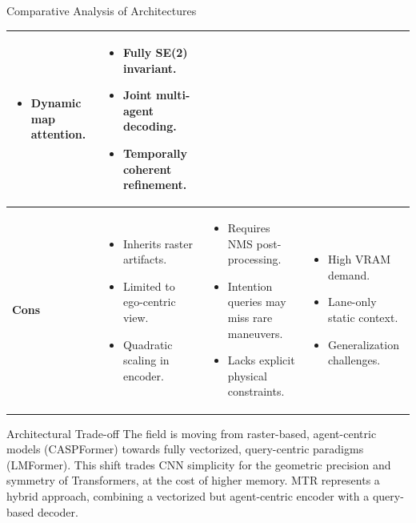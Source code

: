\documentclass[10pt,aspectratio=169]{beamer}
\newcommand{\redominus}{\textcolor{myred}{\ding{55}}}
\begin{document}
\begin{frame}{Comparative Analysis of Architectures}
\begin{table}
\begin{tabular}{|p{1.9cm}|p{3.9cm}|p{3.9cm}|p{3.9cm}|}
\begin{itemize}
            \item Dynamic map attention.
        \end{itemize} &
        \begin{itemize}
            \item Fully SE(2) invariant.
            \item Joint multi-agent decoding.
            \item Temporally coherent refinement.
        \end{itemize} \\
        \hline
        \textbf{Cons} \redominus &
        \begin{itemize}
            \item Inherits raster artifacts.
            \item Limited to ego-centric view.
            \item Quadratic scaling in encoder.
        \end{itemize} &
        \begin{itemize}
            \item Requires NMS post-processing.
            \item Intention queries may miss rare maneuvers.
            \item Lacks explicit physical constraints.
        \end{itemize} &
        \begin{itemize}
            \item High VRAM demand.
            \item Lane-only static context.
            \item Generalization challenges.
        \end{itemize} \\
        \hline
    \end{tabular}
    \end{table}
    \begin{alertblock}{Architectural Trade-off}
        The field is moving from raster-based, agent-centric models (CASPFormer) towards fully vectorized, query-centric paradigms (LMFormer). This shift trades CNN simplicity for the geometric precision and symmetry of Transformers, at the cost of higher memory. MTR represents a hybrid approach, combining a vectorized but agent-centric encoder with a query-based decoder.
    \end{alertblock}
\end{frame}


\end{document}

